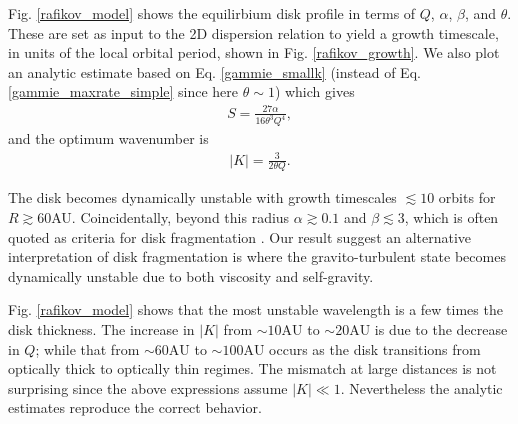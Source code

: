 Fig. \ref{rafikov_model} shows the equilirbium disk profile in terms
of $Q$, $\alpha$, $\beta$, and $\theta$. These are set as input to the
2D dispersion relation to yield a growth timescale, in units of the
local orbital period, shown in Fig. \ref{rafikov_growth}. We also plot
an analytic estimate based on Eq. \ref{gammie_smallk} (instead of
Eq. \ref{gammie_maxrate_simple} since here $\theta\sim 1$) which gives 
\begin{align}
  S = \frac{27\alpha}{16\theta^3Q^4}, 
\end{align}
and the optimum wavenumber is
\begin{align}
  |K| = \frac{3}{2\theta Q}.
\end{align}

The disk becomes dynamically unstable with growth timescales $\lesssim
10$ orbits for $R\gtrsim60$AU. Coincidentally, beyond this radius
$\alpha\gtrsim 0.1$ and $\beta\lesssim 3$, which is often quoted as 
criteria for disk fragmentation \citep[e.g.][]{rafikov15}. 
Our result suggest an alternative interpretation of disk fragmentation
is where the gravito-turbulent state becomes dynamically unstable due to
both viscosity and self-gravity. 

Fig. \ref{rafikov_model} shows that the most unstable wavelength is a
few times the disk thickness. The increase in $|K|$ from $\sim
10\mathrm{AU}$ to $\sim 20\mathrm{AU}$ is due to the decrease in $Q$;
while that from $\sim 60\mathrm{AU}$ to $\sim 100\mathrm{AU}$ occurs
as the disk transitions from optically thick to optically thin
regimes. The mismatch at large distances is not surprising since the
above expressions assume $|K|\ll 1$. Nevertheless the analytic
estimates reproduce the correct behavior. 


